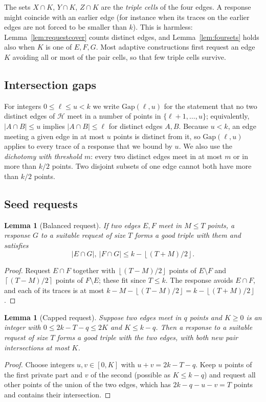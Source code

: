 \documentclass[11pt]{article}
\numberwithin{equation}{section}
\newtheorem{lemma}[theorem]{Lemma}
\theoremstyle{definition}
\theoremstyle{remark}
\newcommand{\HH}{\mathcal H}
\newcommand{\ceil}[1]{\left\lceil #1\right\rceil}
\newcommand{\floor}[1]{\left\lfloor #1\right\rfloor}
\newcommand{\Gap}{\mathrm{Gap}}
\begin{document}
The sets $X\cap K$, $Y\cap K$, $Z\cap K$ are the \emph{triple cells} of
the four edges. A response might coincide with an earlier edge (for
instance when its traces on the earlier edges are not forced to be smaller
than $k$). This is harmless: Lemma~\ref{lem:requestcover} counts distinct
edges, and Lemma~\ref{lem:foursets} holds also when $K$ is one of $E,F,G$. Most adaptive constructions first request an edge $K$
avoiding all or most of the pair cells, so that few triple cells
survive.

\subsection{Intersection gaps}
For integers $0\le\ell\le u<k$ we write $\Gap(\ell,u)$ for the statement
that no two distinct edges of $\HH$ meet in a number of points in
$\{\ell+1,\dots,u\}$; equivalently, $|A\cap B|\le u$ implies
$|A\cap B|\le\ell$ for distinct edges $A,B$. Because $u<k$, an edge
meeting a given edge in at most $u$ points is distinct from it, so
$\Gap(\ell,u)$ applies to every trace of a response that we bound by
$u$. We also use the \emph{dichotomy with threshold $m$}: every two
distinct edges meet in at most $m$ or in more than $k/2$ points. Two
disjoint subsets of one edge cannot both have more than $k/2$ points.

\subsection{Seed requests}
\begin{lemma}[Balanced request]\label{lem:balanced}
If two edges $E,F$ meet in $M\le T$ points, a response $G$ to a suitable
request of size $T$ forms a good triple with them and satisfies
\[
 |E\cap G|,\ |F\cap G|\le k-\floor{(T+M)/2}.
\]
\end{lemma}
\begin{proof}
Request $E\cap F$ together with $\floor{(T-M)/2}$ points of $E\setminus F$
and $\ceil{(T-M)/2}$ points of $F\setminus E$; these fit since $T\le k$.
The response avoids $E\cap F$, and each of its traces is at most
$k-M-\floor{(T-M)/2}=k-\floor{(T+M)/2}$.
\end{proof}

\begin{lemma}[Capped request]\label{lem:caps}
Suppose two edges meet in $q$ points and $K\ge0$ is an integer with
$0\le2k-T-q\le2K$ and $K\le k-q$. Then a response to a suitable request
of size $T$ forms a good triple with the two edges, with both new pair
intersections at most $K$.
\end{lemma}
\begin{proof}
Choose integers $u,v\in[0,K]$ with $u+v=2k-T-q$. Keep $u$ points of the
first private part and $v$ of the second (possible as $K\le k-q$) and
request all other points of the union of the two edges, which has
$2k-q-u-v=T$ points and contains their intersection.
\end{proof}
\end{document}
